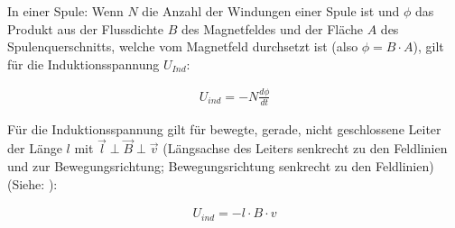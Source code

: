 In einer Spule: Wenn $N$ die Anzahl der Windungen einer Spule ist und $\phi$ das Produkt aus der Flussdichte $B$ des Magnetfeldes und der Fläche $A$ des Spulenquerschnitts, welche vom Magnetfeld durchsetzt ist (also $\phi = B \cdot A$), gilt für die Induktionsspannung $U_{Ind}$:

\begin{align} \label{eq:InduGe}
	U_{ind} = -N \frac{d\phi}{dt}
\end{align}

\noindent Für die Induktionsspannung gilt für bewegte, gerade, nicht geschlossene Leiter der Länge $l$ mit $\vec{l} \perp \vec{B} \perp \vec{v}$ (Längsachse des Leiters senkrecht zu den Feldlinien und zur Bewegungsrichtung; Bewegungsrichtung senkrecht zu den Feldlinien)(Siehe: ):

\begin{align}
	U_{ind} = -l \cdot B \cdot v
\end{align}